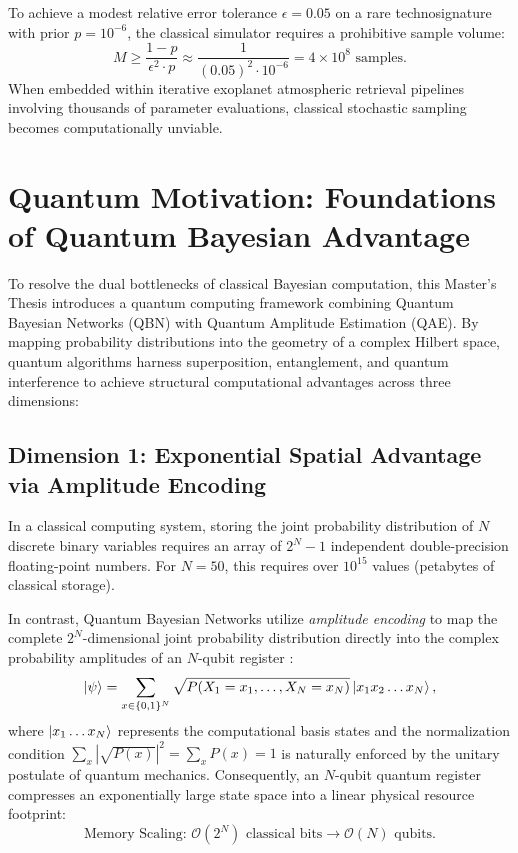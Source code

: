To achieve a modest relative error tolerance $\epsilon = 0.05$ on a rare technosignature with prior $p = 10^{-6}$, the classical simulator requires a prohibitive sample volume:
\begin{equation}
M \ge \frac{1-p}{\epsilon^2 \cdot p} \approx \frac{1}{(0.05)^2 \cdot 10^{-6}} = 4 \times 10^8 \text{ samples}.
\end{equation}
When embedded within iterative exoplanet atmospheric retrieval pipelines involving thousands of parameter evaluations, classical stochastic sampling becomes computationally unviable.

\section{Quantum Motivation: Foundations of Quantum Bayesian Advantage}\label{sec:quantum_motivation}

To resolve the dual bottlenecks of classical Bayesian computation, this Master's Thesis introduces a quantum computing framework combining Quantum Bayesian Networks (QBN) with Quantum Amplitude Estimation (QAE). By mapping probability distributions into the geometry of a complex Hilbert space, quantum algorithms harness superposition, entanglement, and quantum interference to achieve structural computational advantages across three dimensions:

\subsection{Dimension 1: Exponential Spatial Advantage via Amplitude Encoding}
In a classical computing system, storing the joint probability distribution of $N$ discrete binary variables requires an array of $2^N - 1$ independent double-precision floating-point numbers. For $N = 50$, this requires over $10^{15}$ values (petabytes of classical storage).

In contrast, Quantum Bayesian Networks utilize \emph{amplitude encoding} to map the complete $2^N$-dimensional joint probability distribution directly into the complex probability amplitudes of an $N$-qubit register \cite{low2014}:
\begin{equation}
\left|\psi\right\rangle = \sum_{x \in \{0,1\}^N} \sqrt{P(X_1=x_1, \dots, X_N=x_N)} \left|x_1 x_2 \dots x_N\right\rangle,
\label{eq:quantum_state_encoding_ch1}
\end{equation}
where $\left|x_1 \dots x_N\right\rangle$ represents the computational basis states and the normalization condition $\sum_x |\sqrt{P(x)}|^2 = \sum_x P(x) = 1$ is naturally enforced by the unitary postulate of quantum mechanics. Consequently, an $N$-qubit quantum register compresses an exponentially large state space into a linear physical resource footprint:
\begin{equation}
\text{Memory Scaling: } \mathcal{O}(2^N) \text{ classical bits} \longrightarrow \mathcal{O}(N) \text{ qubits}.
\end{equation}

